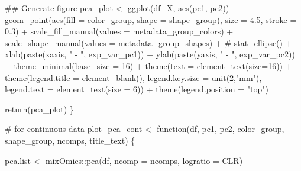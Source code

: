 \documentclass[
  letterpaper,
]{book}
\newenvironment{Shaded}{}{}
\newcommand{\AttributeTok}[1]{\textcolor[rgb]{0.84,0.23,0.29}{#1}}
\newcommand{\CommentTok}[1]{\textcolor[rgb]{0.42,0.45,0.49}{#1}}
\newcommand{\ControlFlowTok}[1]{\textcolor[rgb]{0.84,0.23,0.29}{#1}}
\newcommand{\DecValTok}[1]{\textcolor[rgb]{0.00,0.36,0.77}{#1}}
\newcommand{\DocumentationTok}[1]{\textcolor[rgb]{0.42,0.45,0.49}{#1}}
\newcommand{\FloatTok}[1]{\textcolor[rgb]{0.00,0.36,0.77}{#1}}
\newcommand{\FunctionTok}[1]{\textcolor[rgb]{0.44,0.26,0.76}{#1}}
\newcommand{\NormalTok}[1]{\textcolor[rgb]{0.14,0.16,0.18}{#1}}
\newcommand{\OtherTok}[1]{\textcolor[rgb]{0.44,0.26,0.76}{#1}}
\newcommand{\SpecialCharTok}[1]{\textcolor[rgb]{0.00,0.36,0.77}{#1}}
\newcommand{\StringTok}[1]{\textcolor[rgb]{0.01,0.18,0.38}{#1}}
\begin{document}
\begin{Shaded}
\begin{Highlighting}[]
    \DocumentationTok{\#\# Generate figure}
\NormalTok{    pca\_plot }\OtherTok{\textless{}{-}} \FunctionTok{ggplot}\NormalTok{(df\_X, }\FunctionTok{aes}\NormalTok{(pc1, pc2)) }\SpecialCharTok{+}
     \FunctionTok{geom\_point}\NormalTok{(}\FunctionTok{aes}\NormalTok{(}\AttributeTok{fill =}\NormalTok{ color\_group, }\AttributeTok{shape =}\NormalTok{ shape\_group), }\AttributeTok{size =} \FloatTok{4.5}\NormalTok{, }\AttributeTok{stroke =} \FloatTok{0.3}\NormalTok{) }\SpecialCharTok{+}
     \FunctionTok{scale\_fill\_manual}\NormalTok{(}\AttributeTok{values =}\NormalTok{ metadata\_group\_colors) }\SpecialCharTok{+}
     \FunctionTok{scale\_shape\_manual}\NormalTok{(}\AttributeTok{values =}\NormalTok{ metadata\_group\_shapes) }\SpecialCharTok{+}
     \CommentTok{\# stat\_ellipse() +}
     \FunctionTok{xlab}\NormalTok{(}\FunctionTok{paste}\NormalTok{(xaxis, }\StringTok{" {-} "}\NormalTok{, exp\_var\_pc1)) }\SpecialCharTok{+}
     \FunctionTok{ylab}\NormalTok{(}\FunctionTok{paste}\NormalTok{(yaxis, }\StringTok{" {-} "}\NormalTok{, exp\_var\_pc2)) }\SpecialCharTok{+}
     \FunctionTok{theme\_minimal}\NormalTok{(}\AttributeTok{base\_size =} \DecValTok{16}\NormalTok{) }\SpecialCharTok{+}
     \FunctionTok{theme}\NormalTok{(}\AttributeTok{text =} \FunctionTok{element\_text}\NormalTok{(}\AttributeTok{size=}\DecValTok{16}\NormalTok{)) }\SpecialCharTok{+}
     \FunctionTok{theme}\NormalTok{(}\AttributeTok{legend.title =} \FunctionTok{element\_blank}\NormalTok{(),}
           \AttributeTok{legend.key.size =} \FunctionTok{unit}\NormalTok{(}\DecValTok{2}\NormalTok{,}\StringTok{"mm"}\NormalTok{),}
           \AttributeTok{legend.text =} \FunctionTok{element\_text}\NormalTok{(}\AttributeTok{size =} \DecValTok{6}\NormalTok{)) }\SpecialCharTok{+}
     \FunctionTok{theme}\NormalTok{(}\AttributeTok{legend.position =} \StringTok{"top"}\NormalTok{)}

    \FunctionTok{return}\NormalTok{(pca\_plot)}
\NormalTok{\}}

\CommentTok{\# for continuous data}
\NormalTok{plot\_pca\_cont }\OtherTok{\textless{}{-}} \ControlFlowTok{function}\NormalTok{(df, pc1, pc2, color\_group, shape\_group, ncomps, title\_text) \{}

\NormalTok{    pca.list }\OtherTok{\textless{}{-}}\NormalTok{ mixOmics}\SpecialCharTok{::}\FunctionTok{pca}\NormalTok{(df, }\AttributeTok{ncomp =}\NormalTok{ ncomps, }\AttributeTok{logratio =} \StringTok{\textquotesingle{}CLR\textquotesingle{}}\NormalTok{)}


\end{Highlighting}
\end{Shaded}
\end{document}

